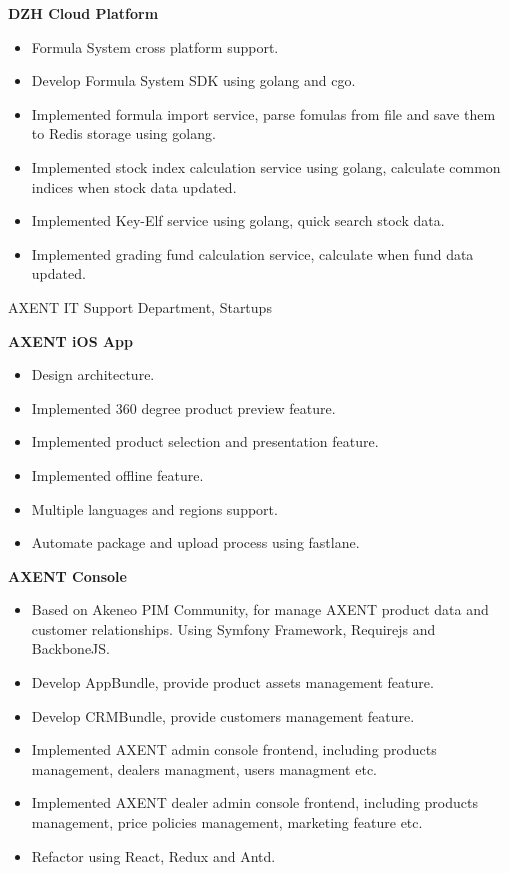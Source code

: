 \documentclass{resume}
\begin{document}
\begin{onehalfspacing}
    \textbf{DZH Cloud Platform}
    \begin{itemize}
        \item Formula System cross platform support.
        \item Develop Formula System SDK using golang and cgo.
        \item Implemented formula import service, parse fomulas from file and save them to Redis storage using golang.
        \item Implemented stock index calculation service using golang, calculate common indices when stock data updated.
        \item Implemented Key-Elf service using golang, quick search stock data.
        \item Implemented grading fund calculation service, calculate when fund data updated.
    \end{itemize}
\end{onehalfspacing}

AXENT IT Support Department, Startups
\begin{onehalfspacing}
    \textbf{AXENT iOS App}
    \begin{itemize}
        \item Design architecture.
        \item Implemented 360 degree product preview feature.
        \item Implemented product selection and presentation feature.
        \item Implemented offline feature.
        \item Multiple languages and regions support.
        \item Automate package and upload process using fastlane.
    \end{itemize}
\end{onehalfspacing}

\begin{onehalfspacing}
    \textbf{AXENT Console}
    \begin{itemize}
        \item Based on Akeneo PIM Community, for manage AXENT product data and customer relationships. Using Symfony Framework, Requirejs and BackboneJS.
        \item Develop AppBundle, provide product assets management feature.
        \item Develop CRMBundle, provide customers management feature.
        \item Implemented AXENT admin console frontend, including products management, dealers managment, users managment etc.
        \item Implemented AXENT dealer admin console frontend, including products management, price policies management, marketing feature etc.
        \item Refactor using React, Redux and Antd.
    \end{itemize}
\end{onehalfspacing}
\end{document}
